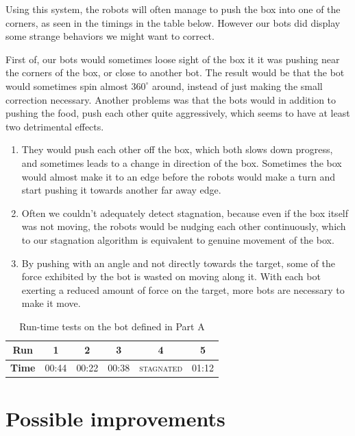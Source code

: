 \documentclass[a4paper,10pt]{article}
\begin{document}
Using this system, the robots will often manage to push the box into one of
the corners, as seen in the timings in the table below. However our bots did
display some strange behaviors we might want to correct.

First of, our bots would sometimes loose sight of the box it it was
pushing near the corners of the box, or close to another bot. The result would
be that the bot would sometimes spin almost $360^\circ$ around, instead of
just making the small correction necessary. Another problems was that the
bots would in addition to pushing the food, push each other quite aggressively,
which seems to have at least two detrimental effects.
\begin{enumerate}
\item They would push
each other off the box, which both slows down progress, and sometimes
leads to a change in direction of the box. Sometimes the box would almost
make it to an edge before the robots would make a turn and start pushing
it towards another far away edge.
\item Often we couldn't adequately detect stagnation, because even if
the box itself was not moving, the robots would be nudging each other
continuously, which to our stagnation algorithm is equivalent to genuine
movement of the box.
\item By pushing with an angle and not directly towards the target, some of 
    the force exhibited by the bot is wasted on moving along it. With each bot 
    exerting a reduced amount of force on the target, more bots are necessary 
    to make it move.
\end{enumerate}

\begin{table}
    \centering
    \begin{tabular}{c|c|c|c|c|c}
        \textbf{Run}    & \textbf{1} & \textbf{2} & \textbf{3} &
        \textbf{4}      & \textbf{5}     \\ \hline
        \textbf{Time}   & 00:44 & 00:22 & 00:38 &
        \textsc{stagnated} & 01:12 \\
    \end{tabular}
    \caption{Run-time tests on the bot defined in Part A}
\end{table}


\section{Possible improvements}
\label{sec:b1}
\end{document}
